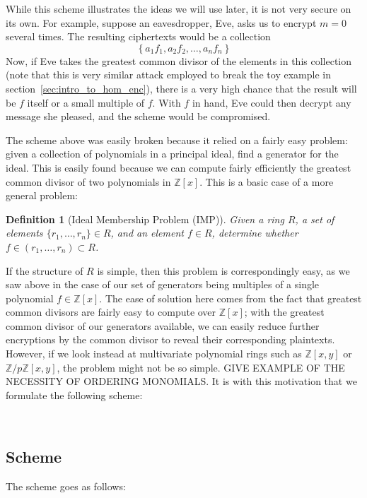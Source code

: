 \documentclass[11pt]{report}
\newtheorem{definition}{Definition}
\newcommand{\Z}{\mathbb{Z}}
\newcommand{\Zx}{\mathbb{Z}[x]}
\newcommand{\Zxy}{\mathbb{Z}[x,y]}
\newcommand{\Zpxy}{\mathbb{Z}/p\mathbb{Z}[x,y]}
\begin{document}
While this scheme illustrates the ideas we will use later, it is not very secure on its own. For example, suppose an eavesdropper, Eve, asks us to encrypt $m=0$ several times. The resulting ciphertexts would be a collection
\[\left\{ a_1f_1, a_2f_2,\dots ,a_nf_n\right\}\]
Now, if Eve takes the greatest common divisor of the elements in this collection (note that this is very similar attack employed to break the toy example in section~\ref{sec:intro_to_hom_enc}), there is a very high chance that the result will be $f$ itself or a small multiple of $f$. With $f$ in hand, Eve could then decrypt any message she pleased, and the scheme would be compromised.

The scheme above was easily broken because it relied on a fairly easy problem: given a collection of polynomials in a principal ideal, find a generator for the ideal. This is easily found because we can compute fairly efficiently the greatest common divisor of two polynomials in $\Z[x]$. This is a basic case of a more general problem:

\begin{definition}[Ideal Membership Problem (IMP)]
Given a ring $R$, a set of elements $\{r_1,\dots,r_n\}\in R$, and an element $f\in R$, determine whether $f\in (r_1,\dots,r_n) \subset R$.
\end{definition}

If the structure of $R$ is simple, then this problem is correspondingly easy, as we saw above in the case of our set of generators being multiples of a single polynomial $f\in \Zx$. The ease of solution here comes from the fact that greatest common divisors are fairly easy to compute over $\Zx$; with the greatest common divisor of our generators available, we can easily reduce further encryptions by the common divisor to reveal their corresponding plaintexts. However, if we look instead at multivariate polynomial rings such as $\Zxy$ or $\Zpxy$, the problem might not be so simple. GIVE EXAMPLE OF THE NECESSITY OF ORDERING MONOMIALS. It is with this motivation that we formulate the following scheme:

\

\subsection{Scheme}

The scheme goes as follows:
\end{document}
